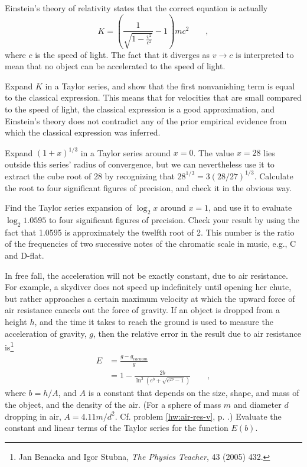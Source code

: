 \begin{hwsection}
\begin{hw}
Einstein's theory of relativity states that the correct equation is actually
\begin{equation*}
  K = \left(\frac{1}{\sqrt{1-\frac{v^2}{c^2}}}-1\right)mc^2 \qquad ,
\end{equation*}
where $c$ is the speed of light. The fact that it diverges as $v \rightarrow c$ is interpreted
to mean that no object can be accelerated to the speed of light.

Expand $K$ in a Taylor series, and show that the first
nonvanishing term is equal to the classical expression. This means that for velocities that
are small compared to the speed of light, the classical expression is a good approximation,
and Einstein's theory does not contradict any of the prior empirical evidence from which
the classical expression was inferred.
\end{hw}

\pagebreak

\begin{hw}
Expand $(1+x)^{1/3}$ in a Taylor series around $x=0$. The value $x=28$ lies outside
this series' radius of convergence, but we can nevertheless use it to
extract the cube root of 28 by recognizing that $28^{1/3}=3(28/27)^{1/3}$.
Calculate the root to four significant figures of precision, and check it
in the obvious way.
\end{hw}

\begin{hw}
Find the Taylor series expansion of $\log_2 x$ around $x=1$, and use it to evaluate
$\log_2 1.0595$ to four significant figures of precision. Check your result by using the
fact that 1.0595 is approximately the twelfth root of 2. This number is the ratio of
the frequencies of two successive notes of the chromatic scale
in music, e.g., C and D-flat.
\end{hw}

\begin{hw}\label{hw:air-res-taylor}
In free fall, the acceleration will not be exactly constant, due to air resistance. For example,
a skydiver does not speed up indefinitely until opening her chute, but rather approaches a certain
maximum velocity at which the upward force of air resistance cancels out the force of gravity.
If an object is dropped from a height $h$, and the time it takes to reach the ground is used to
measure the acceleration of gravity, $g$, then the relative error in the result due to air
resistance is\footnote{Jan Benacka
and Igor Stubna, \emph{The Physics Teacher}, 43 (2005) 432.}
\begin{align*}
  E &= \frac{g-g_{vacuum}}{g} \\
   & = 1-\frac{2b}{\ln^2\left(e^b+\sqrt{e^{2b}-1}\right)} \qquad ,
\end{align*}
where $b=h/A$, and
$A$ is a constant that depends on the size, shape, and mass of the object, and the density of
the air.   (For a sphere of mass $m$ and diameter $d$ dropping in air, $A=4.11m/d^2$. Cf. problem \ref{hw:air-res-v}, p. \pageref{hw:air-res-v}.)
Evaluate the constant and linear terms of the Taylor series for the function $E(b)$.
\end{hw}


\end{hwsection}
